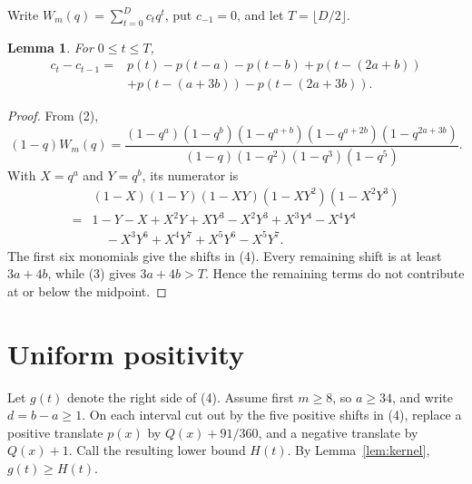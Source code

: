 \documentclass[11pt]{article}
\newtheorem{lemma}[theorem]{Lemma}
\begin{document}
Write \(W_m(q)=\sum_{t=0}^Dc_tq^t\), put \(c_{-1}=0\), and let
\(T=\lfloor D/2\rfloor\).

\begin{lemma}\label{lem:difference}
For \(0\leq t\leq T\),
\begin{align*}
c_t-c_{t-1}={}&p(t)-p(t-a)-p(t-b)+p(t-(2a+b))\\
&+p(t-(a+3b))-p(t-(2a+3b)). \tag{4}
\end{align*}
\end{lemma}

\begin{proof}
From (2),
\[
(1-q)W_m(q)=
\frac{(1-q^a)(1-q^b)(1-q^{a+b})(1-q^{a+2b})
(1-q^{2a+3b})}
{(1-q)(1-q^2)(1-q^3)(1-q^5)}.
\]
With \(X=q^a\) and \(Y=q^b\), its numerator is
\begin{align*}
&(1-X)(1-Y)(1-XY)(1-XY^2)(1-X^2Y^3)\\
={}&1-Y-X+X^2Y+XY^3-X^2Y^3+X^3Y^4-X^4Y^4\\
&\quad-X^3Y^6+X^4Y^7+X^5Y^6-X^5Y^7.
\end{align*}
The first six monomials give the shifts in (4).  Every remaining shift is at
least \(3a+4b\), while (3) gives
\(3a+4b>T\).  Hence the remaining terms do not contribute at or below the
midpoint.
\end{proof}

\section{Uniform positivity}

Let \(g(t)\) denote the right side of (4).  Assume first \(m\geq8\), so
\(a\geq34\), and write \(d=b-a\geq1\).  On each interval cut out by the five
positive shifts in (4), replace a positive translate \(p(x)\) by
\(Q(x)+91/360\), and a negative translate by \(Q(x)+1\).  Call the resulting
lower bound \(H(t)\).  By Lemma~\ref{lem:kernel}, \(g(t)\geq H(t)\).
\end{document}
